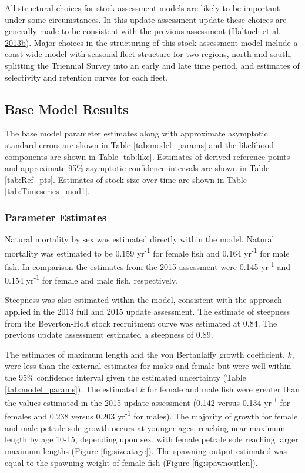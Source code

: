 \documentclass[12pt,]{article}
\begin{document}
All structural choices for stock assessment models are likely to be
important under some circumstances. In this update assessment update
these choices are generally made to be consistent with the previous
assessment (Haltuch et al.
\protect\hyperlink{ref-haltuch_status_2013}{2013}\protect\hyperlink{ref-haltuch_status_2013}{b}).
Major choices in the structuring of this stock assessment model include
a coast-wide model with seasonal fleet structure for two regions, north
and south, splitting the Triennial Survey into an early and late time
period, and estimates of selectivity and retention curves for each
fleet.

\subsection{Base Model Results}\label{base-model-results}

The base model parameter estimates along with approximate asymptotic
standard errors are shown in Table \ref{tab:model_params} and the
likelihood components are shown in Table \ref{tab:like}. Estimates of
derived reference points and approximate 95\% asymptotic confidence
intervals are shown in Table \ref{tab:Ref_pts}. Estimates of stock size
over time are shown in Table \ref{tab:Timeseries_mod1}.

\subsubsection{Parameter Estimates}\label{parameter-estimates}

Natural mortality by sex was estimated directly within the model.
Natural mortality was estimated to be 0.159 yr\textsuperscript{-1} for
female fish and 0.164 yr\textsuperscript{-1} for male fish. In
comparison the estimates from the 2015 assessment were 0.145
yr\textsuperscript{-1} and 0.154 yr\textsuperscript{-1} for female and
male fish, respectively.

Steepness was also estimated within the model, consistent with the
approach applied in the 2013 full and 2015 update assessment. The
estimate of steepness from the Beverton-Holt stock recruitment curve was
estimated at 0.84. The previous update assessment estimated a steepness
of 0.89.

The estimates of maximum length and the von Bertanlaffy growth
coefficient, \(k\), were less than the external estimates for males and
female but were well within the 95\% confidence interval given the
estimated uncertainty (Table \ref{tab:model_params}). The estimated
\(k\) for female and male fish were greater than the values estimated in
the 2015 update assessment (0.142 versus 0.134 yr\textsuperscript{-1}
for females and 0.238 versus 0.203 yr\textsuperscript{-1} for males).
The majority of growth for female and male petrale sole growth occurs at
younger ages, reaching near maximum length by age 10-15, depending upon
sex, with female petrale sole reaching larger maximum lengths (Figure
\ref{fig:sizeatage}). The spawning output estimated was equal to the
spawning weight of female fish (Figure \ref{fig:spawnoutlen}).
\end{document}
